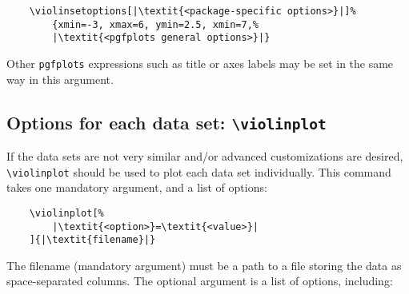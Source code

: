 \documentclass{article}
\begin{document}
\begin{verbatim}
	\violinsetoptions[|\textit{<package-specific options>}|]%
		{xmin=-3, xmax=6, ymin=2.5, xmin=7,%
		|\textit{<pgfplots general options>}|}
\end{verbatim}

Other \texttt{pgfplots} expressions such as title or axes labels may be set
in the same way in this argument.

\subsection{Options for each data set: \texttt{{\textbackslash}violinplot}}

If the data sets are not very similar and/or advanced customizations
are desired, \texttt{{\textbackslash}violinplot} should be used to
plot each data set individually.
This command takes one mandatory argument, and a list of options:

\begin{verbatim}
	\violinplot[%
		|\textit{<option>}=\textit{<value>}|
	]{|\textit{filename}|}
\end{verbatim}

The filename (mandatory argument) must be a path to a file storing the data as
space-separated columns. The optional argument is a list of options, including:
\end{document}
